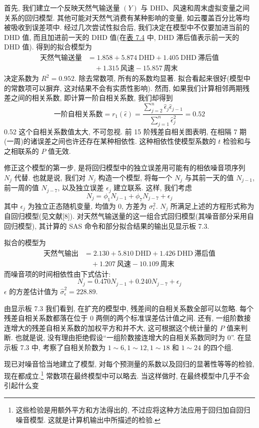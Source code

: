 
首先, 我们建立一个反映天然气输送量 $(Y)$ 与 DHD、风速和周末虚拟变量之间关系的回归模型. 其他可能对天然气消费有某种影响的变量, 如云覆盖百分比等均被吸收到误差项中. 经过几次尝试性拟合后, 我们决定在模型中不仅要加进当前的 DHD 值, 而且加进前一天的 DHD 值(在\hyperref[tab:7.4]{表 7.4} 中, DHD 滞后值表示前一天的 DHD 值). 得到的拟合模型为
\[
\begin{aligned}
\text{天然气输送量}&=1.858+5.874\ \mathrm{DHD}+1.405\ \mathrm{DHD}\ \text{滞后值}\\
&\quad+1.315\ \text{风速}-15.857\ \text{周末}
\end{aligned}
\]
决定系数为 $R^2=0.952$. 除去常数项, 所有的系数均显著. 拟合看起来很好(模型中的常数项可以摒弃, 这对结果不会有实质性影响). 然而, 如果我们计算相邻两期残差之间的相关系数, 即计算一阶自相关系数, 我们却得到
\[
\text{一阶自相关系数}=r_1(\hat{\epsilon})=\frac{\sum_{j=2}^{n}\hat{\epsilon}_j\hat{\epsilon}_{j-1}}{\sum_{j=1}^{n}\hat{\epsilon}_j^2}=0.52
\]
0.52 这个自相关系数值太大, 不可忽视. 前 15 阶残差自相关图表明, 在相隔 7 期(一周)的诸误差之间也许还存在某种相依性. 这种相依性使模型系数的 $t$ 检验和与之相联系的 $P$ 值无效.

修正这个模型的第一步, 是将回归模型中的独立误差用可能有的相依噪音项序列 $N_j$ 代替. 也就是说, 我们对 $N_j$ 构造一个模型, 将每一个 $N_j$ 与其前一天的值 $N_{j-1}$, 前一周的值 $N_{j-7}$, 以及独立误差 $\epsilon_j$ 建立联系. 这样, 我们考虑
\[
N_j=\phi_1N_{j-1}+\phi_7N_{j-7}+\epsilon_j
\]
其中 $\epsilon_j$ 为独立正态随机变量, 均值为 0, 方差为 $\sigma_\epsilon^2$. $N_j$ 所满足上述的方程形式称为自回归模型(见文献[8]). 对天然气输送量的这一组合式回归模型(其噪音部分采用自回归模型), 其计算的 SAS 命令和部分拟合结果的输出见显示板 7.3.

拟合的模型为
\[
\begin{aligned}
\text{天然气输出}&=2.130+5.810\ \mathrm{DHD}+1.426\ \mathrm{DHD}\ \text{滞后值}\\
&\quad+1.207\ \text{风速}-10.109\ \text{周末}
\end{aligned}
\]
而噪音项的时间相依性由下式估计:
\[
N_j=0.470N_{j-1}+0.240N_{j-7}+\epsilon_j
\]
$\epsilon$ 的方差估计值为 $\hat{\sigma}_\epsilon^2=228.89$.

由显示板 7.3 我们看到, 在扩充的模型中, 残差间的自相关系数全部可以忽略. 每个残差自相关系数都落在位于 0 两侧的两个标准误差估计值之间. 还有, 一组阶数接连增大的残差自相关系数的加权平方和并不大, 这可根据这个统计量的 $P$ 值来判断. 也就是说, 没有理由拒绝假设“一组阶数接连增大的自相关系数同时为 0”. 在显示板 7.3 中, 考察了自相关阶数为 $1\sim6, 1\sim12, 1\sim18$ 和 $1\sim24$ 的四个组.

现已对噪音恰当地建立了模型, 对每个预测量的系数以及回归的显著性等等的检验, 现在都成立.\footnote{{\footnotesize 这些检验是用额外平方和方法得出的, 不过应将这种方法应用于回归加自回归噪音模型. 这就是计算机输出中所描述的检验.}} 常数项在最终模型中可以略去. 当这样做时, 在最终模型中几乎不会引起什么变
